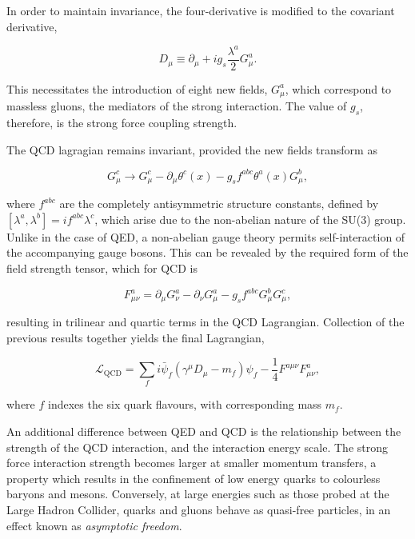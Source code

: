 In order to maintain invariance, the four-derivative is modified to the covariant derivative,

\begin{equation}
    D_{\mu} \equiv \partial_{\mu} + ig_{s}\frac{\lambda^{a}}{2}G^{a}_{\mu}.
\end{equation}

\noindent This necessitates the introduction of eight new fields, ${G_{\mu}^{a}}$, which correspond to massless gluons, the mediators of the strong interaction. The value of ${g_{s}}$, therefore, is the strong force coupling strength. 

The QCD lagragian remains invariant, provided the new fields transform as

\begin{equation}
    G_{\mu}^{c} \rightarrow G_{\mu}^{c} - \partial_{\mu}\theta^{c}(x) - g_{s}f^{abc}\theta^{a}(x)G_{\mu}^{b},
\end{equation}

\noindent where ${f^{abc}}$ are the completely antisymmetric structure constants, defined by ${\left[ \lambda^{a},\lambda^{b} \right] = if^{abc}\lambda^{c}}$, which arise due to the non-abelian nature of the SU(3) group. Unlike in the case of QED, a non-abelian gauge theory permits self-interaction of the accompanying gauge bosons. This can be revealed by the required form of the field strength tensor, which for QCD is

\begin{equation}
      F^{a}_{\mu\nu} = \partial_{\mu}G_{\nu}^{a} - \partial_{\nu}G_{\mu}^{a} - g_{s}f^{abc}G^{b}_{\mu}G^{c}_{\mu}, 
\end{equation}

\noindent resulting in trilinear and quartic terms in the QCD Lagrangian. Collection of the previous results together yields the final Lagrangian,

\begin{equation}
    \mathcal{L_{\mathrm{QCD}}} = \sum_{f} i\bar{\psi}_{f}(\gamma^{\mu}D_{\mu} - m_{f})\psi_{f} - \frac{1}{4}F^{a\mu\nu}F_{\mu\nu}^{a},
\end{equation}

\noindent where ${f}$ indexes the six quark flavours, with corresponding mass ${m_{f}}$. %

An additional difference between QED and QCD is the relationship between the strength of the QCD interaction, and the interaction energy scale. The strong force interaction strength becomes larger at smaller momentum transfers, a property which results in the confinement of low energy quarks to colourless baryons and mesons. Conversely, at large energies such as those probed at the Large Hadron Collider, quarks and gluons behave as quasi-free particles, in an effect known as \textit{asymptotic freedom}.




